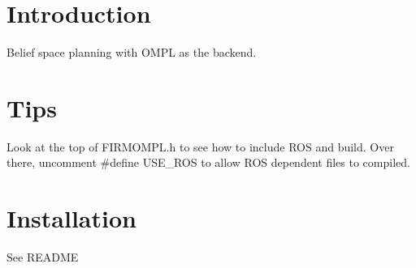 \hypertarget{index_Introduction}{}\section{Introduction}\label{index_Introduction}
Belief space planning with O\+M\+PL as the backend.\hypertarget{index_Tips}{}\section{Tips}\label{index_Tips}
Look at the top of F\+I\+R\+M\+O\+M\+P\+L.\+h to see how to include R\+OS and build. Over there, uncomment \#define U\+S\+E\+\_\+\+R\+OS to allow R\+OS dependent files to compiled.\hypertarget{index_install_sec}{}\section{Installation}\label{index_install_sec}
See R\+E\+A\+D\+ME 